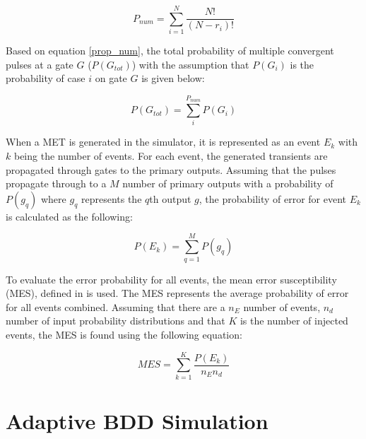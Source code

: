 \begin{equation} \label{prop_num}
P_{num} = \sum_{i=1}^{N} \frac{N!}{(N-r_i)!}
\end{equation} 

Based on equation \ref{prop_num}, the total probability of multiple convergent pulses at a gate $G$ ($P(G_{tot})$) with the assumption that $P(G_i)$ is the probability of case $i$ on gate $G$ is given below:

\begin{equation} \label{tot_gate}
P(G_{tot}) = \sum_{i}^{P_{num}} P(G_i)
\end{equation}

When a MET is generated in the simulator, it is represented as an event $E_k$ with $k$ being the number of events. For each event, the generated transients are propagated through gates to the primary outputs. Assuming that the pulses propagate through to a $M$ number of primary outputs with a probability of $P(g_q)$ where $g_q$ represents the $q$th output $g$, the probability of error for event $E_k$ is calculated as the following:  

\begin{equation} \label{event_eq}
P(E_k) = \sum_{q=1}^{M} P(g_q)
\end{equation}

To evaluate the error probability for all events, the mean error susceptibility (MES), defined in \cite{METsys} is used. The MES represents the average probability of error for all events combined. Assuming that there are a $n_E$ number of events, $n_d$ number of input probability distributions and that $K$ is the number of injected events, the MES is found using the following equation:

\begin{equation} \label{MES}
MES = \sum_{k=1}^{K} \frac{P(E_k)}{n_E n_d}
\end{equation}

\section{Adaptive BDD Simulation}